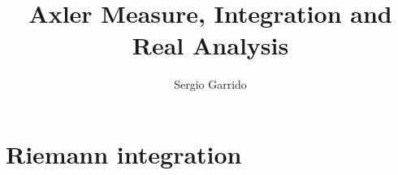 \documentclass{bookSolutions}
\title{Axler Measure, Integration and Real Analysis}
\author{Sergio Garrido}
\begin{document}
\maketitle

\tableofcontents

\newpage

\section{Riemann integration}



% 

% 
% 
% 
% 

% 
% 
% 

% 
% 
% 

% 

% 
% 
% 
% 

% 
% 
% 
\end{document}
